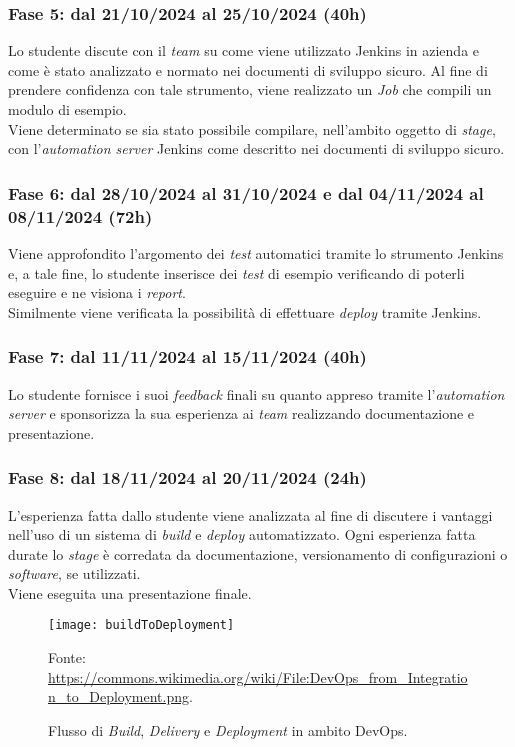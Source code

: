 \subsubsection*{Fase 5: dal 21/10/2024 al 25/10/2024 (40h) }
Lo studente discute con il \emph{team} su come viene utilizzato Jenkins in azienda e come è stato analizzato e normato nei documenti di sviluppo sicuro. Al fine di prendere confidenza con tale strumento, viene realizzato un \emph{Job} che compili un modulo di esempio.\\
Viene determinato se sia stato possibile compilare, nell'ambito oggetto di \emph{stage}, con l'\emph{automation server} Jenkins come descritto nei documenti di sviluppo sicuro.

\subsubsection*{Fase 6: dal 28/10/2024 al 31/10/2024 e dal 04/11/2024 al 08/11/2024 (72h)}
Viene approfondito l'argomento dei \emph{test} automatici tramite lo strumento Jenkins e, a tale fine, lo studente inserisce dei \emph{test} di esempio verificando di poterli eseguire e ne visiona i \emph{report}.\\
Similmente viene verificata la possibilità di effettuare \emph{deploy} tramite Jenkins.

\subsubsection*{Fase 7: dal 11/11/2024 al 15/11/2024 (40h) }
Lo studente fornisce i suoi \emph{feedback} finali su quanto appreso tramite l'\emph{automation server} e sponsorizza la sua esperienza ai \emph{team} realizzando documentazione e presentazione.

\subsubsection*{Fase 8: dal 18/11/2024 al 20/11/2024 (24h) }
L'esperienza fatta dallo studente viene analizzata al fine di discutere i vantaggi nell'uso di un sistema di \emph{build} e \emph{deploy} automatizzato. Ogni esperienza fatta durate lo \emph{stage} è corredata da documentazione, versionamento di configurazioni o \emph{software}, se utilizzati.\\
Viene eseguita una presentazione finale.\\
\begin{figure}[htbp] 
    \centering 
    \texttt{[image: buildToDeployment]}
    \caption{Flusso di \emph{Build}, \emph{Delivery} e \emph{Deployment} in ambito DevOps.} 
    \label{fig:buildToDeployment}
    \vspace{1mm}
    Fonte: \url{https://commons.wikimedia.org/wiki/File:DevOps_from_Integration_to_Deployment.png}.
\end{figure}


